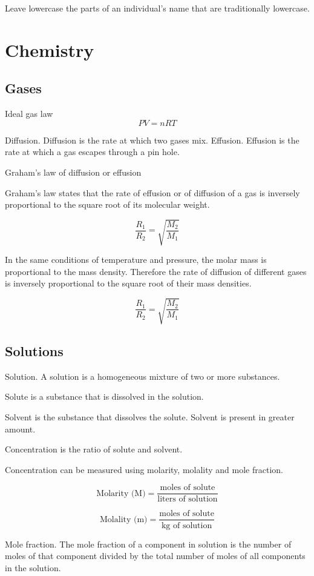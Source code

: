 \documentclass[12pt, oneside]{book}
\begin{document}
Leave lowercase the parts of an individual's name that are traditionally lowercase.

\part{Chemistry}

\chapter{Gases}

Ideal gas law
\[PV = nRT\]

Diffusion. Diffusion is the rate at which two gases mix.
Effusion. Effusion is the rate at which a gas escapes through a pin hole.

Graham's law of diffusion or effusion

Graham's law states that the rate of effusion or of diffusion of a gas is
inversely proportional to the square root of its molecular weight.

\[\frac{R_1}{R_2} = \sqrt{\frac{M_2}{M_1}}\]

In the same conditions of temperature and pressure, the molar mass is
proportional to the mass density. Therefore the rate of diffusion of different
gases is inversely proportional to the square root of their mass densities.

\[\frac{R_1}{R_2} = \sqrt{\frac{M_2}{M_1}}\]

\chapter{Solutions}

Solution. A solution is a homogeneous mixture of two or more substances.

Solute is a substance that is dissolved in the solution.

Solvent is the substance that dissolves the solute. Solvent is present in
greater amount.

Concentration is the ratio of solute and solvent.

Concentration can be measured using molarity, molality and mole fraction.

\[\text{Molarity (M)} = \frac{\text{moles of solute}}{\text{liters of
solution}}\]

\[\text{Molality (m)} = \frac{\text{moles of solute}}{\text{kg of solution}}\]

Mole fraction. The mole fraction of a component in solution is the number of
moles of that component divided by the total number of moles of all components
in the solution.
\end{document}
